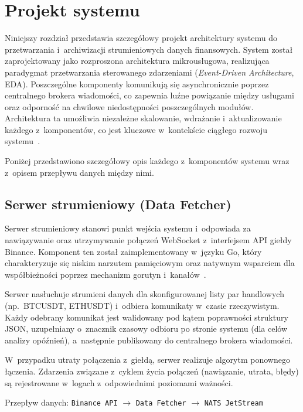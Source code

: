 \chapter{Projekt systemu}
\label{ch:projekt}

Niniejszy rozdział przedstawia szczegółowy projekt architektury systemu do przetwarzania i~archiwizacji strumieniowych
danych finansowych.
System został zaprojektowany jako rozproszona architektura mikrousługowa, realizująca paradygmat przetwarzania
sterowanego zdarzeniami (\textit{Event-Driven Architecture}, EDA).
Poszczególne komponenty komunikują się asynchronicznie poprzez centralnego brokera wiadomości, co zapewnia luźne
powiązanie między usługami oraz odporność na chwilowe niedostępności poszczególnych modułów.
Architektura ta umożliwia niezależne skalowanie, wdrażanie i~aktualizowanie każdego z~komponentów, co jest kluczowe
w~kontekście ciągłego rozwoju systemu~\cite{edge_computing_satya}.

Poniżej przedstawiono szczegółowy opis każdego z~komponentów systemu wraz z~opisem przepływu danych między nimi.


\section{Serwer strumieniowy (Data Fetcher)}
\label{sec:data_fetcher}

Serwer strumieniowy stanowi punkt wejścia systemu i~odpowiada za nawiązywanie oraz utrzymywanie połączeń WebSocket
z~interfejsem API giełdy Binance.
Komponent ten został zaimplementowany w~języku Go, który charakteryzuje się niskim narzutem pamięciowym oraz natywnym
wsparciem dla współbieżności poprzez mechanizm gorutyn i~kanałów~\cite{go_at_google}.

Serwer nasłuchuje strumieni danych dla skonfigurowanej listy par handlowych (np.\ BTCUSDT, ETHUSDT) i~odbiera
komunikaty w~czasie rzeczywistym.
Każdy odebrany komunikat jest walidowany pod kątem poprawności struktury JSON, uzupełniany o~znacznik czasowy odbioru
po stronie systemu (dla celów analizy opóźnień), a~następnie publikowany do centralnego brokera wiadomości.

W~przypadku utraty połączenia z~giełdą, serwer realizuje algorytm ponownego łączenia.
Zdarzenia związane z~cyklem życia połączeń (nawiązanie, utrata, błędy) są rejestrowane w~logach z~odpowiednimi
poziomami ważności.

Przepływ danych: \texttt{Binance API} $\rightarrow$ \texttt{Data Fetcher} $\rightarrow$ \texttt{NATS JetStream}



